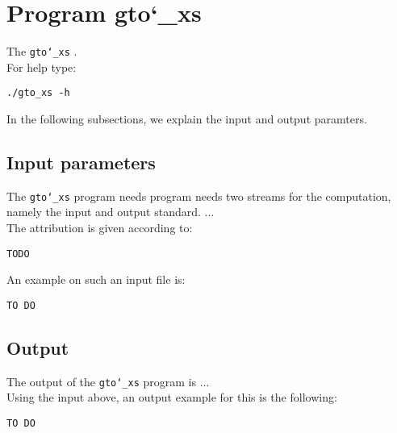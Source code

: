 \section{Program gto\char`_xs}
The \texttt{gto\char`_xs} .\\
For help type:
\begin{lstlisting}
./gto_xs -h
\end{lstlisting}
In the following subsections, we explain the input and output paramters.

\subsection*{Input parameters}

The \texttt{gto\char`_xs} program needs program needs two streams for the computation, namely the input and output standard. ...\\
The attribution is given according to:
\begin{lstlisting}
TODO
\end{lstlisting}
An example on such an input file is:
\begin{lstlisting}
TO DO
\end{lstlisting}

\subsection*{Output}
The output of the \texttt{gto\char`_xs} program is ...\\
Using the input above, an output example for this is the following:
\begin{lstlisting}
TO DO
\end{lstlisting}